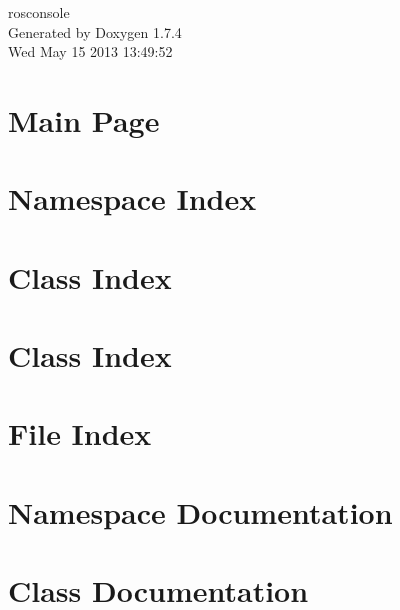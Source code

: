 \documentclass[a4paper]{book}
\begin{document}
\begin{titlepage}
\vspace*{7cm}
\begin{center}
{\Large rosconsole }\\
\vspace*{1cm}
{\large Generated by Doxygen 1.7.4}\\
\vspace*{0.5cm}
{\small Wed May 15 2013 13:49:52}\\
\end{center}
\end{titlepage}
\clearemptydoublepage
{}
\tableofcontents
\clearemptydoublepage
{}
\chapter{Main Page}
\label{index}
\chapter{Namespace Index}

\chapter{Class Index}

\chapter{Class Index}

\chapter{File Index}

\chapter{Namespace Documentation}








\chapter{Class Documentation}
























\end{document}

